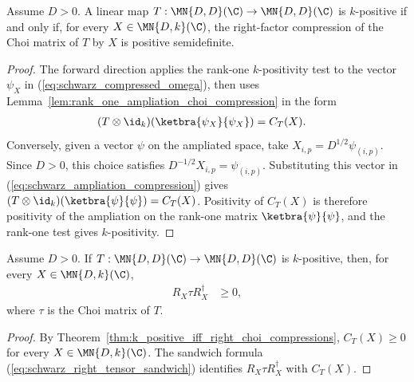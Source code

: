 \begin{theorem}
    \label{thm:k_positive_iff_right_choi_compressions}
    \leanok
    Assume $D>0$. A linear map
    $T:\MN{D,D}(\C)\to\MN{D,D}(\C)$ is $k$-positive if and only if, for every
    $X\in\MN{D,k}(\C)$, the right-factor compression of the Choi matrix of
    $T$ by $X$ is positive semidefinite.
\end{theorem}

\begin{proof}
    \leanok
    The forward direction applies the rank-one $k$-positivity test to the
    vector $\psi_X$ in (\ref{eq:schwarz_compressed_omega}), then uses
    Lemma~\ref{lem:rank_one_ampliation_choi_compression} in the form
    \begin{align}
        (T\otimes\id_k)(\ketbra{\psi_X}{\psi_X})
         & =C_T(X).
        \label{eq:schwarz_ampliation_compression}
    \end{align}
    Conversely, given a vector $\psi$ on the ampliated space, take
    $X_{i,p}=D^{1/2}\psi_{(i,p)}$. Since $D>0$, this choice satisfies
    $D^{-1/2}X_{i,p}=\psi_{(i,p)}$. Substituting this vector in
    (\ref{eq:schwarz_ampliation_compression}) gives
    $(T\otimes\id_k)(\ketbra{\psi}{\psi})=C_T(X)$.
    Positivity of $C_T(X)$ is therefore positivity of the ampliation on the
    rank-one matrix $\ketbra{\psi}{\psi}$, and the rank-one test gives
    $k$-positivity.
\end{proof}

\begin{theorem}
    \label{thm:k_positive_right_tensor_choi_sandwiches}
    \leanok
    Assume $D>0$. If
    $T:\MN{D,D}(\C)\to\MN{D,D}(\C)$ is $k$-positive, then, for every
    $X\in\MN{D,k}(\C)$,
    \begin{align}
        R_X\tau R_X^\dagger
         & \ge0,
        \label{eq:schwarz_k_positive_choi_sandwich}
    \end{align}
    where $\tau$ is the Choi matrix of $T$.
\end{theorem}

\begin{proof}
    \leanok
    By Theorem~\ref{thm:k_positive_iff_right_choi_compressions},
    $C_T(X)\ge0$ for every $X\in\MN{D,k}(\C)$. The sandwich formula
    (\ref{eq:schwarz_right_tensor_sandwich}) identifies
    $R_X\tau R_X^\dagger$ with $C_T(X)$.
\end{proof}

